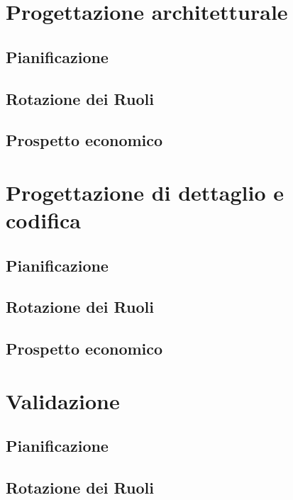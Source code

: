 \documentclass[12pt,a4paper]{article}
\begin{document}
\newpage
\section{Progettazione architetturale} %

\subsection{Pianificazione}

\subsection{Rotazione dei Ruoli}

\subsection{Prospetto economico}

\newpage
\section{Progettazione di dettaglio e codifica} %

\subsection{Pianificazione}

\subsection{Rotazione dei Ruoli}

\subsection{Prospetto economico}

\newpage
\section{Validazione} %

\subsection{Pianificazione}

\subsection{Rotazione dei Ruoli}
\end{document}
